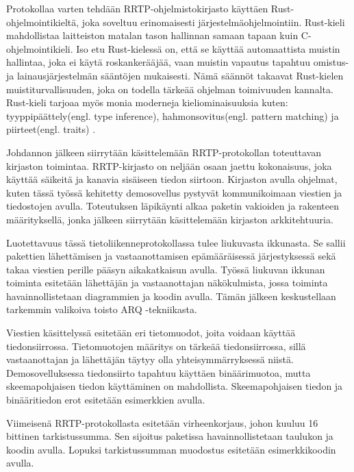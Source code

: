 \documentclass[a4paper,12pt]{article}
\begin{document}
    Protokollaa varten tehdään RRTP-ohjelmistokirjasto käyttäen Rust-ohjelmointikieltä, joka soveltuu erinomaisesti järjestelmäohjelmointiin. Rust-kieli mahdollistaa laitteiston matalan tason hallinnan
    samaan tapaan kuin C-ohjelmointikieli. Iso etu Rust-kielessä on, että se käyttää automaattista muistin hallintaa, joka ei käytä roskankerääjää, vaan muistin vapautus tapahtuu omistus- ja lainausjärjestelmän sääntöjen mukaisesti.
    Nämä säännöt takaavat Rust-kielen muistiturvallisuuden, joka on todella tärkeää ohjelman toimivuuden kannalta. 
    Rust-kieli tarjoaa myös monia moderneja kieliominaisuuksia kuten: tyyppipäättely(engl. type inference), hahmonsovitus(engl. pattern matching) ja piirteet(engl. traits) \cite{rust-book}.

    Johdannon jälkeen siirrytään käsittelemään RRTP-protokollan toteuttavan kirjaston toimintaa. RRTP-kirjasto on neljään osaan jaettu kokonaisuus, joka käyttää säikeitä ja kanavia sisäiseen tiedon siirtoon. Kirjaston avulla ohjelmat, kuten tässä työssä kehitetty demosovellus pystyvät kommunikoimaan viestien ja tiedostojen avulla. 
    Toteutuksen läpikäynti alkaa paketin vakioiden ja rakenteen määrityksellä, jonka jälkeen siirrytään käsittelemään kirjaston arkkitehtuuria. \par

    Luotettavuus tässä tietoliikenneprotokollassa tulee liukuvasta ikkunasta. Se sallii pakettien lähettämisen ja vastaanottamisen epämääräisessä järjestyksessä sekä takaa viestien perille pääsyn aikakatkaisun avulla. Työssä liukuvan ikkunan toiminta esitetään lähettäjän ja vastaanottajan näkökulmista, jossa toiminta havainnollistetaan diagrammien ja koodin avulla. Tämän jälkeen keskustellaan tarkemmin valikoiva toisto ARQ -tekniikasta. \par

    Viestien käsittelyssä esitetään eri tietomuodot, joita voidaan käyttää tiedonsiirrossa. Tietomuotojen määritys on tärkeää tiedonsiirrossa, sillä vastaanottajan ja lähettäjän täytyy olla yhteisymmärryksessä niistä. Demosovelluksessa tiedonsiirto tapahtuu käyttäen binäärimuotoa, mutta skeemapohjaisen tiedon käyttäminen on mahdollista. Skeemapohjaisen tiedon ja binääritiedon erot esitetään esimerkkien avulla.\par

    Viimeisenä RRTP-protokollasta esitetään virheenkorjaus, johon kuuluu 16 bittinen tarkistussumma. Sen sijoitus paketissa havainnollistetaan taulukon ja koodin avulla. Lopuksi tarkistussumman muodostus esitetään esimerkkikoodin avulla.\par
\end{document}
